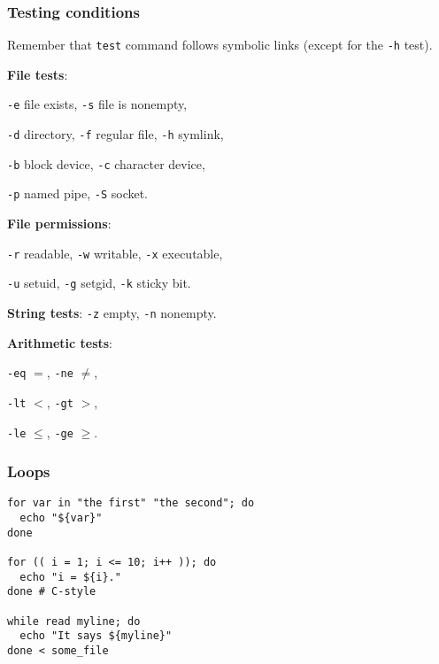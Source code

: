 \subsubsection{Testing conditions}
Remember that \texttt{test} command follows symbolic links (except for the \texttt{-h} test).
\begin{compactenum}
\item \textbf{File tests}:
\begin{compactenum}
    \item \texttt{-e} file exists,
    \texttt{-s} file is nonempty,
    \item \texttt{-d} directory,
    \texttt{-f} regular file,
    \texttt{-h} symlink,
    \item \texttt{-b} block device,
    \texttt{-c} character device,
    \item \texttt{-p} named pipe,
    \texttt{-S} socket.
\end{compactenum}
\item \textbf{File permissions}:
\begin{compactenum}
    \item \texttt{-r} readable,
    \texttt{-w} writable,
    \texttt{-x} executable,
    \item \texttt{-u} setuid,
    \texttt{-g} setgid,
    \texttt{-k} sticky bit.
\end{compactenum}
\item \textbf{String tests}: \texttt{-z} empty, \texttt{-n} nonempty.
\item \textbf{Arithmetic tests}:
\begin{compactenum}
  \item \texttt{-eq} $=$,
  \texttt{-ne} $\neq$,
  \item \texttt{-lt} $<$,
  \texttt{-gt} $>$,
  \item \texttt{-le} $\le$,
  \texttt{-ge} $\ge$.
\end{compactenum}
\end{compactenum}

\subsubsection{Loops}
\begin{verbatim}
for var in "the first" "the second"; do
  echo "${var}"
done

for (( i = 1; i <= 10; i++ )); do
  echo "i = ${i}."
done # C-style

while read myline; do
  echo "It says ${myline}"
done < some_file
\end{verbatim}

